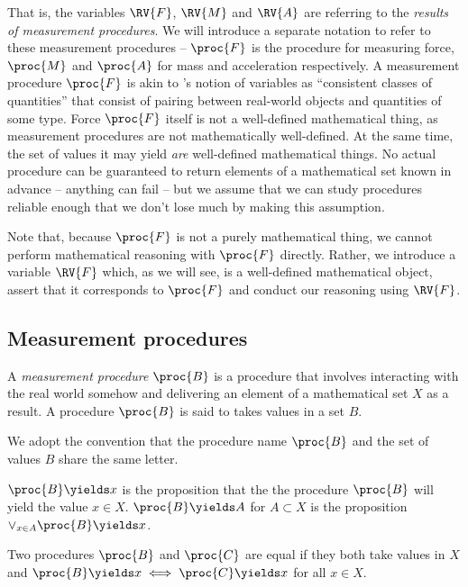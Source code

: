 That is, the variables $\RV{F}$, $\RV{M}$ and $\RV{A}$ are referring to the \emph{results of measurement procedures}. We will introduce a separate notation to refer to these measurement procedures -- $\proc{F}$ is the procedure for measuring force, $\proc{M}$ and $\proc{A}$ for mass and acceleration respectively. A measurement procedure $\proc{F}$ is akin to \citet{menger_random_2003}'s notion of variables as ``consistent classes of quantities'' that consist of pairing between real-world objects and quantities of some type. Force $\proc{F}$ itself is not a well-defined mathematical thing, as measurement procedures are not mathematically well-defined. At the same time, the set of values it may yield \emph{are} well-defined mathematical things. No actual procedure can be guaranteed to return elements of a mathematical set known in advance -- anything can fail -- but we assume that we can study procedures reliable enough that we don't lose much by making this assumption.

Note that, because $\proc{F}$ is not a purely mathematical thing, we cannot perform mathematical reasoning with $\proc{F}$ directly. Rather, we introduce a variable $\RV{F}$ which, as we will see, is a well-defined mathematical object, assert that it corresponds to $\proc{F}$ and conduct our reasoning using $\RV{F}$.

\subsection{Measurement procedures}\label{sec:mprocs}

\begin{definition}
A \emph{measurement procedure} $\proc{B}$ is a procedure that involves interacting with the real world somehow and delivering an element of a mathematical set $X$ as a result. A procedure $\proc{B}$ is said to takes values in a set $B$.
\end{definition}

We adopt the convention that the procedure name $\proc{B}$ and the set of values $B$ share the same letter.

\begin{definition}
$\proc{B}\yields x$ is the proposition that the the procedure $\proc{B}$ will yield the value $x\in X$. $\proc{B}\yields A$ for $A\subset X$ is the proposition $\lor_{x\in A} \proc{B}\yields x$.
\end{definition}

\begin{definition}\label{def:equality}
Two procedures $\proc{B}$ and $\proc{C}$ are equal if they both take values in $X$ and $\proc{B}\yields x\iff \proc{C}\yields x$ for all $x\in X$.
\end{definition}

